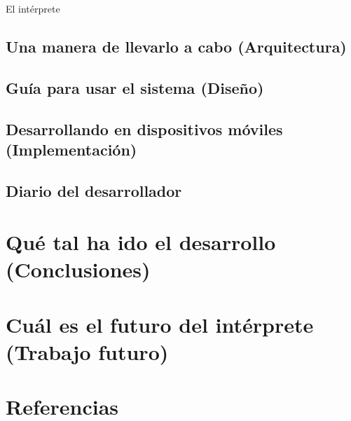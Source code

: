 \documentclass[12pt]{article}
\begin{document}
El intérprete 

\subsection{Una manera de llevarlo a cabo (Arquitectura)}

\subsection{Guía para usar el sistema (Diseño)}

\subsection{Desarrollando en dispositivos móviles (Implementación)}

\subsection{Diario del desarrollador}

\newpage
\section{Qué tal ha ido el desarrollo (Conclusiones)}

\newpage
\section{Cuál es el futuro del intérprete (Trabajo futuro)}

\newpage
\section{Referencias}
\end{document}
